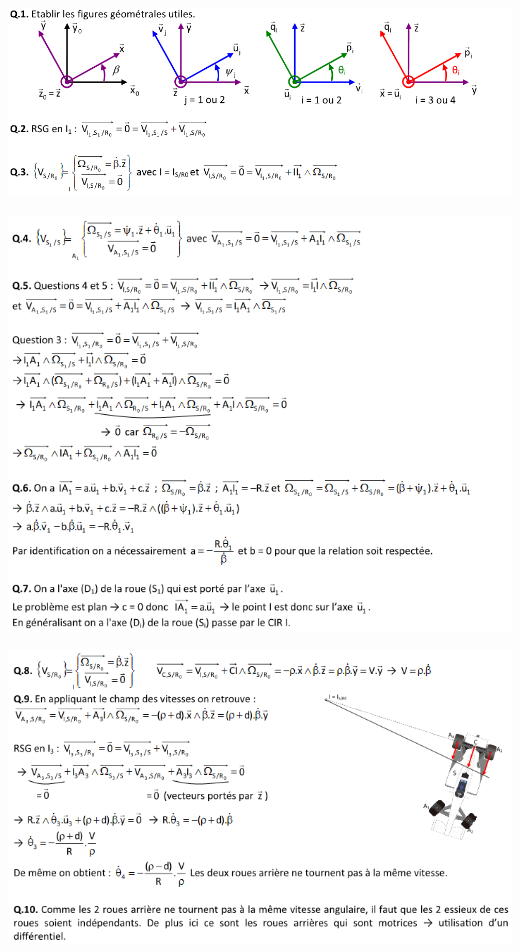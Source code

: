 \documentclass[10pt,fleqn]{article} %
\begin{document}
\begin{center}
\includegraphics[width=\linewidth]{images/cor_01}
\end{center}


\begin{center}
\includegraphics[width=\linewidth]{images/cor_02}
\end{center}


\begin{center}
\includegraphics[width=\linewidth]{images/cor_03}
\end{center}
\end{document}
